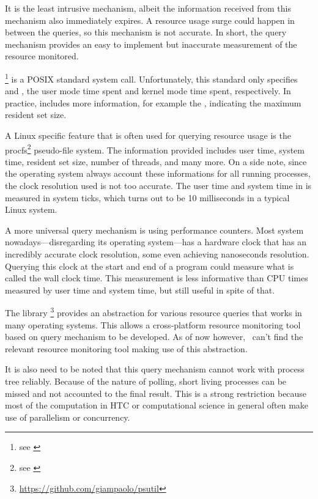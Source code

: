 It is the least intrusive mechanism, albeit the information received from this mechanism also immediately expires.
A resource usage surge could happen in between the queries, so this mechanism is not accurate.
In short, the query mechanism provides an easy to implement but inaccurate measurement of the resource monitored.

\footnote{see \href{https://linux.die.net/man/2/getrusage}{}} is a POSIX standard system call.
Unfortunately, this standard only specifies  and , the user mode time spent and kernel mode time spent, respectively.
In practice,  includes more information, for example the , indicating the maximum resident set size.

A Linux specific feature that is often used for querying resource usage is the procfs\footnote{see \href{https://linux.die.net/man/5/proc}{}} pseudo-file system.
The information provided includes user time, system time, resident set size, number of threads, and many more.
On a side note, since the operating system always account these informations for all running processes, the clock resolution used is not too accurate.
The user time and system time in  is measured in system ticks, which turns out to be 10 milliseconds in a typical Linux system.

A more universal query mechanism is using performance counters.
Most system nowadays---disregarding its operating system---has a hardware clock that has an incredibly accurate clock resolution, some even achieving nanoseconds resolution.
Querying this clock at the start and end of a program could measure what is called the wall clock time.
This measurement is less informative than CPU times measured by user time and system time, but still useful in spite of that.

The library \footnote{\href{https://github.com/giampaolo/psutil}{https://github.com/giampaolo/psutil}} provides an abstraction for various resource queries that works in many operating systems.
This allows a cross-platform resource monitoring tool based on query mechanism to be developed.
As of now however, \first~can't find the relevant resource monitoring tool making use of this abstraction.

It is also need to be noted that this query mechanism cannot work with process tree reliably.
Because of the nature of polling, short living processes can be missed and not accounted to the final result.
This is a strong restriction because most of the computation in HTC or computational science in general often make use of parallelism or concurrency.


